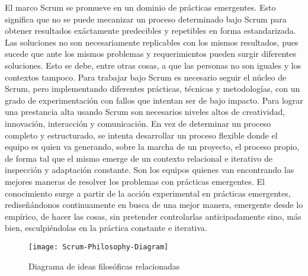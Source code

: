 El marco Scrum se promueve en un dominio de prácticas emergentes. Esto significa que no se puede mecanizar un proceso determinado bajo Scrum para obtener resultados exáctamente predecibles y repetibles en forma estandarizada. Las soluciones no son necesariamente replicables con los mismos resultados, pues sucede que ante los mismos problemas y requerimientos pueden surgir diferentes soluciones. Esto se debe, entre otras cosas, a que las personas no son iguales y los contextos tampoco. Para trabajar bajo Scrum es necesario seguir el núcleo de Scrum, pero implementando diferentes prácticas, técnicas y metodologías, con un grado de experimentación con fallos que intentan ser de bajo impacto. Para lograr una prestancia alta usando Scrum son necesarios niveles altos de creatividad, innovación, interacción y comunicación. En vez de determinar un proceso completo y estructurado, se intenta desarrollar un proceso flexible donde el equipo es quien va generando, sobre la marcha de un proyecto, el proceso propio, de forma tal que el mismo emerge de un contexto relacional e iterativo de inspección y adaptación constante. Son los equipos quienes van encontrando las mejores maneras de resolver los problemas con prácticas emergentes. El conocimiento surge a partir de la acción experimental en prácticas emergentes, rediseñándonos continuamente en busca de una mejor manera, emergente desde lo empírico, de hacer las cosas, sin pretender controlarlas anticipadamente sino, más bien, esculpiéndolas en la práctica constante e iterativa.

\begin{figure}[h] 
  \centering
  \texttt{[image: Scrum-Philosophy-Diagram]}
  \caption{Diagrama de ideas filosóficas relacionadas}
  \centering
  \label{fig:Scrum-Philosophy-Diagram} %
\end{figure}
